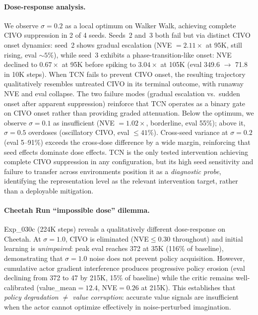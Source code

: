 \paragraph{Dose-response analysis.}
We observe $\sigma{=}0.2$ as a local optimum on Walker Walk, achieving complete CIVO suppression in 2 of 4 seeds. Seeds~2 and~3 both fail but via distinct CIVO onset dynamics: seed~2 shows gradual escalation (NVE $= 2.11\times$ at 95K, still rising, eval ${\sim}5\%$), while seed~3 exhibits a phase-transition-like onset: NVE declined to $0.67\times$ at 95K before spiking to $3.04\times$ at 105K (eval 349.6 $\to$ 71.8 in 10K steps). When TCN fails to prevent CIVO onset, the resulting trajectory qualitatively resembles untreated CIVO in its terminal outcome, with runaway NVE and eval collapse. The two failure modes (gradual escalation vs.\ sudden onset after apparent suppression) reinforce that TCN operates as a binary gate on CIVO onset rather than providing graded attenuation. Below the optimum, we observe $\sigma{=}0.1$ as insufficient (NVE $= 1.02\times$, borderline, eval 55\%); above it, $\sigma{=}0.5$ overdoses (oscillatory CIVO, eval $\leq 41\%$). Cross-seed variance at $\sigma{=}0.2$ (eval 5--91\%) exceeds the cross-dose difference by a wide margin, reinforcing that seed effects dominate dose effects. TCN is the only tested intervention achieving complete CIVO suppression in any configuration, but its high seed sensitivity and failure to transfer across environments position it as a \emph{diagnostic probe}, identifying the representation level as the relevant intervention target, rather than a deployable mitigation.

\paragraph{Cheetah Run ``impossible dose'' dilemma.}
Exp\_030c (224K steps) reveals a qualitatively different dose-response on Cheetah. At $\sigma{=}1.0$, CIVO is eliminated (NVE${\leq}0.30$ throughout) and initial learning is \emph{unimpaired}: peak eval reaches 372 at 35K (116\% of baseline), demonstrating that $\sigma{=}1.0$ noise does not prevent policy acquisition. However, cumulative actor gradient interference produces progressive policy erosion (eval declining from 372 to 47 by 215K, 15\% of baseline) while the critic remains well-calibrated (value\_mean${=}12.4$, NVE${=}0.26$ at 215K). This establishes that \emph{policy degradation $\neq$ value corruption}: accurate value signals are insufficient when the actor cannot optimize effectively in noise-perturbed imagination.

